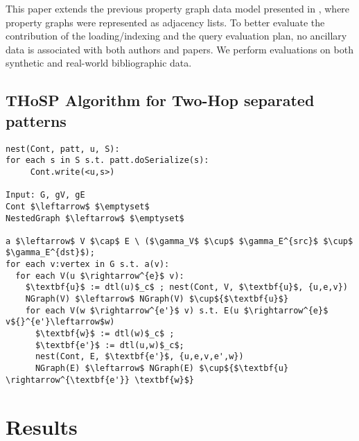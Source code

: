 \documentclass[a0,portrait]{a0poster}
\begin{document}
\begin{multicols}{2}
This paper extends the previous property graph data model presented in \cite{BergamiMM17}, where property graphs were represented as adjacency lists. To better evaluate the contribution of the loading/indexing and the query evaluation plan, no ancillary data is associated with both authors and papers. We perform evaluations on both synthetic and real-world bibliographic data.


\subsection*{THoSP Algorithm for Two-Hop separated patterns}
\begin{lstlisting}[mathescape=true,language=pseudi]
nest(Cont, patt, u, S):
for each s in S s.t. patt.doSerialize(s):
     Cont.write(<u,s>)

Input: G, gV, gE 
Cont $\leftarrow$ $\emptyset$ 
NestedGraph $\leftarrow$ $\emptyset$ 

a $\leftarrow$ V $\cap$ E \ ($\gamma_V$ $\cup$ $\gamma_E^{src}$ $\cup$ $\gamma_E^{dst}$);
for each v:vertex in G s.t. a(v):
  for each V(u $\rightarrow^{e}$ v):
    $\textbf{u}$ := dtl(u)$_c$ ; nest(Cont, V, $\textbf{u}$, {u,e,v})
    NGraph(V) $\leftarrow$ NGraph(V) $\cup${$\textbf{u}$}
    for each V(w $\rightarrow^{e'}$ v) s.t. E(u $\rightarrow^{e}$ v${}^{e'}\leftarrow$w)
      $\textbf{w}$ := dtl(w)$_c$ ;
      $\textbf{e'}$ := dtl(u,w)$_c$; 
      nest(Cont, E, $\textbf{e'}$, {u,e,v,e',w})
      NGraph(E) $\leftarrow$ NGraph(E) $\cup${$\textbf{u} \rightarrow^{\textbf{e'}} \textbf{w}$}
	\end{lstlisting}


\section*{Results}


\end{multicols}
\end{document}
